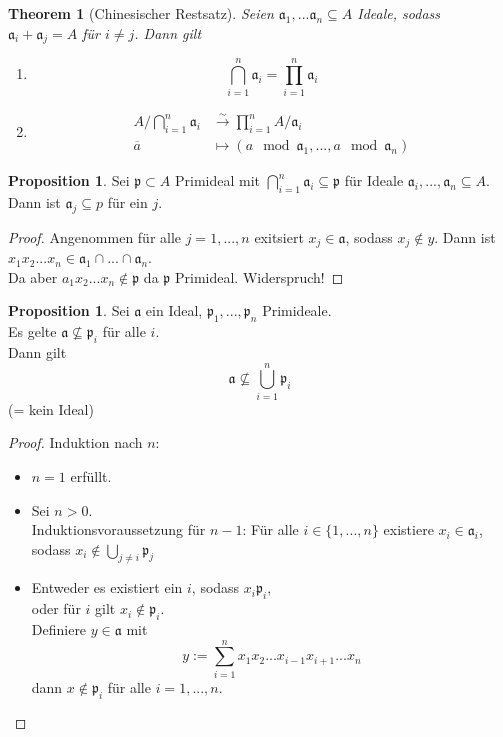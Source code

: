 \documentclass[10pt,a4paper]{article}
\newcommand{\ol}[1]{\overline{#1}}
\newcommand{\isomfunc}{\ensuremath{\xrightarrow{\sim}}}
\newcounter{thm}[section]
\theoremstyle{definition}
\newtheorem{prop}[thm]{Proposition}
\theoremstyle{plain}
\newtheorem{theorem}[thm]{Theorem}
\theoremstyle{remark}
\begin{document}
\begin{theorem}[Chinesischer Restsatz]
	Seien $\mathfrak a_1,...\mathfrak a_n\subseteq A$ Ideale, sodass\\
	$\mathfrak a_i+\mathfrak a_j=A$ für $i\neq j$. Dann gilt
	\begin{enumerate}
		\item \[\bigcap_{i=1}^{n}\mathfrak a_i=\prod_{i=1}^{n}\mathfrak a_i\]
		\item \begin{align*}
		A/\bigcap_{i=1}^n\mathfrak a_i&\isomfunc \prod_{i=1}^nA/\mathfrak a_i\\
		\ol{a}&\mapsto(a\mod\mathfrak a_1,...,a\mod\mathfrak a_n)
		\end{align*}
	\end{enumerate}
\end{theorem}


\begin{prop}
	Sei $\mathfrak p\subset A$ Primideal mit $\bigcap_{i=1}^n\mathfrak a_i\subseteq \mathfrak p$ für Ideale $\mathfrak a_i,...,\mathfrak a_n\subseteq A$.\\
	Dann ist $\mathfrak a_j\subseteq p$ für ein $j$.
\end{prop}
\begin{proof}
	Angenommen für alle $j=1,...,n$ exitsiert $x_j\in\mathfrak a$, sodass $x_j\notin y$. Dann ist $x_1x_2...x_n\in\mathfrak a_1\cap...\cap\mathfrak a_n$.\\
	Da aber $a_1x_2...x_n\notin\mathfrak p$ da $\mathfrak p$ Primideal. Widerspruch!
\end{proof}
\addtocounter{thm}{-1}
\begin{prop}
	Sei $\mathfrak a$ ein Ideal, $\mathfrak p_1,...,\mathfrak p_n$ Primideale.\\
	Es gelte $\mathfrak a\not\subseteq \mathfrak p_i$ für alle $i$.\\
	Dann gilt 
	\[\mathfrak a\not\subseteq \bigcup_{i=1}^n\mathfrak p_i \]
	(= kein Ideal)
\end{prop}
\begin{proof}
	Induktion nach $n$:
	\begin{itemize}
		\item $n=1$ erfüllt.
		\item Sei $n>0$.\\
		Induktionsvoraussetzung für $n-1$: Für alle $i\in\{1,...,n\}$ existiere $x_i\in\mathfrak a_i$, sodass $x_i\notin\bigcup_{j\neq i}\mathfrak p_j$
		\item Entweder es existiert ein $i$, sodass $x_i\mathfrak p_i$,\\
		oder für $i$ gilt $x_i\notin\mathfrak p_i$.\\
		Definiere $y\in \mathfrak a$ mit
		\[y:=\sum_{i=1}^{n}x_1x_2...x_{i-1}x_{i+1}...x_n\]
		dann $x\notin\mathfrak p_i$ für alle $i=1,...,n$.
	\end{itemize}
\end{proof}
\end{document}
